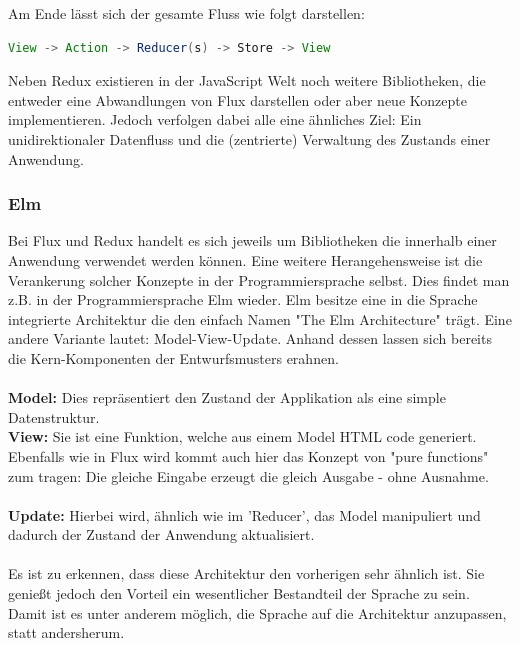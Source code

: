 Am Ende lässt sich der gesamte Fluss wie folgt darstellen:
\\
\begin{lstlisting}[frame=single, language=Java]
View -> Action -> Reducer(s) -> Store -> View
\end{lstlisting}
\bigskip
Neben Redux existieren in der JavaScript Welt noch weitere Bibliotheken, die entweder eine Abwandlungen von Flux darstellen oder aber neue Konzepte implementieren. Jedoch verfolgen dabei alle eine ähnliches Ziel: Ein unidirektionaler Datenfluss und die (zentrierte) Verwaltung des Zustands einer Anwendung.

\subsubsection{Elm}
Bei Flux und Redux handelt es sich jeweils um Bibliotheken die innerhalb einer Anwendung verwendet werden können. Eine weitere Herangehensweise ist die Verankerung solcher Konzepte in der Programmiersprache selbst. Dies findet man z.B. in
der Programmiersprache Elm
\cite{elmIntroduction}
wieder. Elm besitze eine in die Sprache integrierte Architektur die den einfach Namen "The Elm Architecture" 
\cite{theElmArchitecture}
trägt. Eine andere Variante lautet: Model-View-Update. Anhand dessen lassen sich bereits die Kern-Komponenten der Entwurfsmusters erahnen.
\\\\
\textbf{Model:} Dies repräsentiert den Zustand der Applikation als eine simple Datenstruktur.
\\
\textbf{View:} Sie ist eine Funktion, welche aus einem Model HTML code generiert. Ebenfalls wie in Flux wird kommt auch hier das Konzept von "pure functions" zum tragen: Die gleiche Eingabe erzeugt die gleich Ausgabe - ohne Ausnahme.
\\\\
\textbf{Update:}
Hierbei wird, ähnlich wie im 'Reducer', das Model manipuliert und dadurch der Zustand der Anwendung aktualisiert.
\\\\
Es ist zu erkennen, dass diese Architektur den vorherigen sehr ähnlich ist. Sie genießt jedoch den Vorteil ein wesentlicher Bestandteil der Sprache zu sein. Damit ist es unter anderem möglich, die Sprache auf die Architektur anzupassen, statt andersherum.

